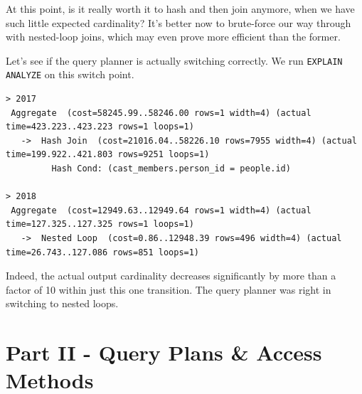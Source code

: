 \documentclass{article}
\begin{document}
\begin{enumerate}
At this point, is it really worth it to hash and then join anymore, when we have such little expected cardinality? It's better now to brute-force our way through with nested-loop joins, which may even prove more efficient than the former.

Let's see if the query planner is actually switching correctly. We run \verb|EXPLAIN ANALYZE| on this switch point.

\footnotesize
\begin{verbatim}
> 2017
 Aggregate  (cost=58245.99..58246.00 rows=1 width=4) (actual time=423.223..423.223 rows=1 loops=1)
   ->  Hash Join  (cost=21016.04..58226.10 rows=7955 width=4) (actual time=199.922..421.803 rows=9251 loops=1)
         Hash Cond: (cast_members.person_id = people.id)

> 2018
 Aggregate  (cost=12949.63..12949.64 rows=1 width=4) (actual time=127.325..127.325 rows=1 loops=1)
   ->  Nested Loop  (cost=0.86..12948.39 rows=496 width=4) (actual time=26.743..127.086 rows=851 loops=1)
\end{verbatim}
\small

Indeed, the actual output cardinality decreases significantly by more than a factor of 10 within just this one transition. The query planner was right in switching to nested loops.

\end{enumerate}

\section*{Part II - Query Plans \& Access Methods}
\end{document}
